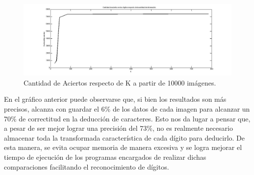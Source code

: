\documentclass[10pt, a4paper]{article}
\begin{document}
\begin{figure}[H] %
\begin{center}
\includegraphics[width=520pt]{./aciertosconk.jpg}
\caption[h]{Cantidad de Aciertos respecto de K a partir de 10000 imágenes.}
\end{center}
\end{figure}

En el gráfico anterior puede observarse que, si bien los resultados son más precisos, alcanza con guardar el 6\% de los datos de cada imagen para alcanzar un 70\% de correctitud en la deducción de caracteres. Esto nos da lugar a pensar que, a pesar de ser mejor lograr una precisión del 73\%, no es realmente necesario almacenar toda la transformada característica de cada dígito para deducirlo. De esta manera, se evita ocupar memoria de manera excesiva y se logra mejorar el tiempo de ejecución de los programas encargados de realizar dichas comparaciones facilitando el reconocimiento de dígitos.
\end{document}
